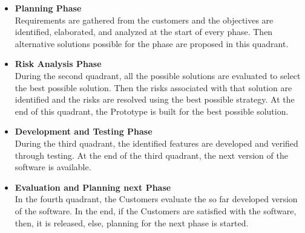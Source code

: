 \begin{itemize}
    \item \textbf{Planning Phase}\\
Requirements are gathered from the customers and the objectives are
identified, elaborated, and analyzed at the start of every phase. Then
alternative solutions possible for the phase are proposed in this quadrant.
     \item \textbf{Risk Analysis Phase}\\
     During the second quadrant, all the possible solutions are evaluated to
select the best possible solution. Then the risks associated with that
solution are identified and the risks are resolved using the best possible
strategy. At the end of this quadrant, the Prototype is built for the best
possible solution.
     
      \item \textbf{Development and Testing Phase}\\
      During the third quadrant, the identified features are developed and
verified through testing. At the end of the third quadrant, the next version
of the software is available.
       \item \textbf{Evaluation and Planning next Phase}\\
       In the fourth quadrant, the Customers evaluate the so far developed version
of the software. In the end, if the Customers are satisfied with the software,
then, it is released, else, planning for the next phase is started.
       
\end{itemize}


\vspace{0.5in}
